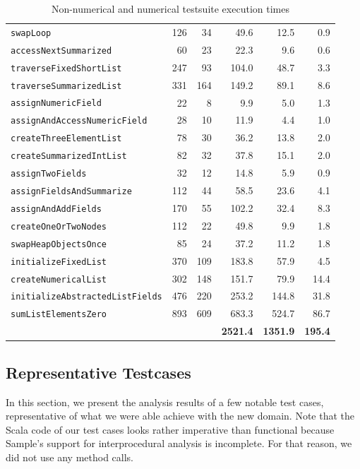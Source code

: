 \documentclass[11pt,a4paper,english]{article}
\begin{document}
\begin{table}
\begin{tabular}{|l|r|r|r|r|r|}
    \texttt{swapLoop} & 126 & 34 & 49.6 & 12.5 & 0.9 \\ 
    \texttt{accessNextSummarized} & 60 & 23 & 22.3 & 9.6 & 0.6 \\ 
    \texttt{traverseFixedShortList} & 247 & 93 & 104.0 & 48.7 & 3.3 \\ 
    \texttt{traverseSummarizedList} & 331 & 164 & 149.2 & 89.1 & 8.6 \\
    \hline
    \texttt{assignNumericField} & 22 & 8 & 9.9 & 5.0 & 1.3 \\ 
    \texttt{assignAndAccessNumericField} & 28 & 10 & 11.9 & 4.4 & 1.0 \\ 
    \texttt{createThreeElementList} & 78 & 30 & 36.2 & 13.8 & 2.0 \\ 
    \texttt{createSummarizedIntList} & 82 & 32 & 37.8 & 15.1 & 2.0 \\ 
    \texttt{assignTwoFields} & 32 & 12 & 14.8 & 5.9 & 0.9 \\ 
    \texttt{assignFieldsAndSummarize} & 112 & 44 & 58.5 & 23.6 & 4.1 \\ 
    \texttt{assignAndAddFields} & 170 & 55 & 102.2 & 32.4 & 8.3 \\ 
    \texttt{createOneOrTwoNodes} & 112 & 22 & 49.8 & 9.9 & 1.8 \\ 
    \texttt{swapHeapObjectsOnce} & 85 & 24 & 37.2 & 11.2 & 1.8 \\ 
    \texttt{initializeFixedList} & 370 & 109 & 183.8 & 57.9 &  4.5 \\ 
    \texttt{createNumericalList} & 302 & 148 & 151.7 & 79.9 & 14.4 \\ 
    \texttt{initializeAbstractedListFields} & 476 & 220 & 253.2 & 144.8 & 31.8 \\ 
    \texttt{sumListElementsZero} & 893 & 609 & 683.3 & 524.7 & 86.7 \\
    \hline
    & & & \textbf{2521.4 }& \textbf{1351.9 }& \textbf{195.4} \\
    \hline
  \end{tabular}
  \caption{Non-numerical and numerical testsuite execution times}
  \label{tbl:times}
\end{table}


\subsection{Representative  Testcases}
In this section, we present the analysis results of a few notable test cases,
representative of what we were able achieve with the new domain. Note that the
Scala code of our test cases looks rather imperative than functional because
Sample's support for interprocedural analysis is incomplete. For that reason, we
did not use any method calls.
\end{document}
